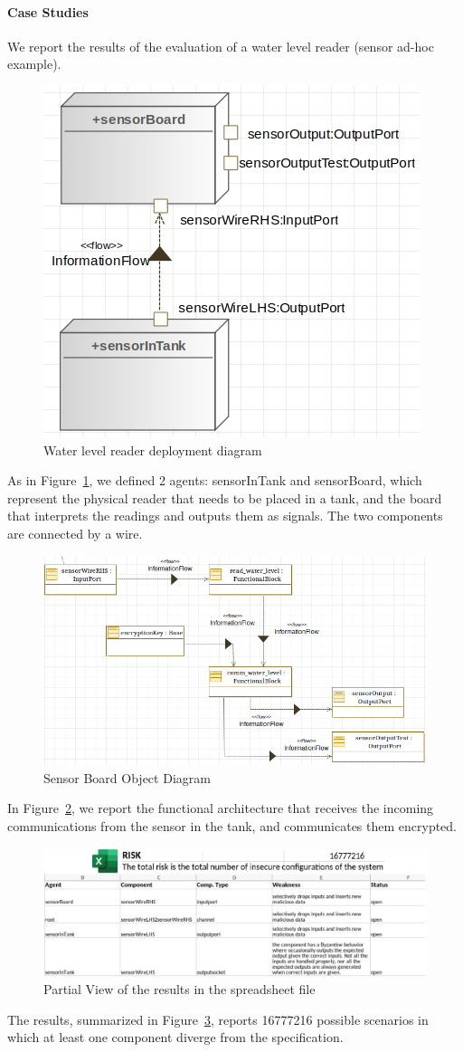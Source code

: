 \documentclass[conference]{IEEEtran}
\begin{document}
\paragraph{Case Studies}
We report the results of the evaluation of a water level reader (sensor ad-hoc example). 
\begin{figure}
	\centering
	\includegraphics[width=.5\columnwidth]{eng_cs1.png}
	\caption{Water level reader deployment diagram}
	\label{fig:eng_cs1}
\end{figure}
As in Figure~\ref{fig:eng_cs1}, we defined 2 agents: sensorInTank and sensorBoard,
which represent the physical reader that needs to be placed in a tank, and 
the board that interprets the readings and outputs them as signals.
The two components are connected by a wire.
\begin{figure}
	\centering
	\includegraphics[width=.9\columnwidth]{internal_cs1.png}
	\caption{Sensor Board Object Diagram}
	\label{fig:int_cs1}
\end{figure}
In Figure~\ref{fig:int_cs1}, we report the functional architecture that
receives the incoming communications from the sensor in the tank, and 
communicates them encrypted.
\begin{figure}
	\centering
	\includegraphics[width=.7\textwidth]{results_excel.pdf}
	\caption{Partial View of the results in the spreadsheet file}
	\label{fig:results}
\end{figure}
The results, summarized in Figure~\ref{fig:results}, reports 16777216
possible scenarios in which at least one component diverge from the specification.
\end{document}
